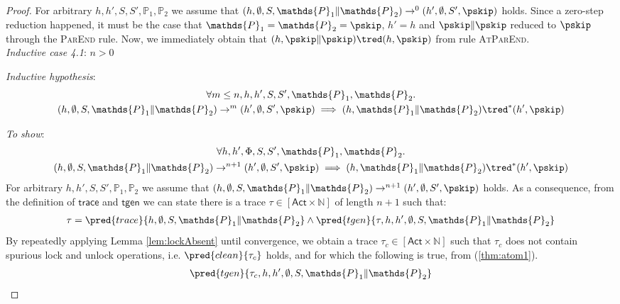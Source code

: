 \begin{thm}
{\begin{proof}
For arbitrary $h, h', S, S', \mathds{P}_1, \mathds{P}_2$ we assume that $(h, \emptyset, S, \mathds{P}_1 \| \mathds{P}_2) \rightarrow^0 (h', \emptyset, S', \pskip)$ holds. Since a zero-step reduction happened, it must be the case that $\mathds{P}_1 = \mathds{P}_2 = \pskip$, $h' = h$ and $\pskip \| \pskip$ reduced to $\pskip$ through the \textsc{ParEnd} rule. Now, we immediately obtain that $(h, \pskip \| \pskip) \tred (h, \pskip)$ from rule \textsc{AtParEnd}. \\

\textit{Inductive case 4.1}: $n > 0$

\textit{Inductive hypothesis}:
\begin{gather*}
	\forall m \leq n, h, h', S, S', \mathds{P}_1, \mathds{P}_2 \ldotp \\
	(h, \emptyset, S, \mathds{P}_1 \| \mathds{P}_2) \rightarrow^m (h', \emptyset, S', \pskip)
	\implies
	(h, \mathds{P}_1 \| \mathds{P}_2) \tred^* (h', \pskip)
\end{gather*}

\textit{To show}:
\begin{gather*}
	\forall h, h', \Phi, S, S', \mathds{P}_1, \mathds{P}_2 \ldotp \\
	(h, \emptyset, S, \mathds{P}_1 \| \mathds{P}_2) \rightarrow^{n+1} (h', \emptyset, S', \pskip)
	\implies
	(h, \mathds{P}_1 \| \mathds{P}_2) \tred^* (h', \pskip)
\end{gather*}
For arbitrary $h, h', S, S', \mathds{P}_1, \mathds{P}_2$ we assume that $(h, \emptyset, S, \mathds{P}_1 \| \mathds{P}_2) \rightarrow^{n+1} (h', \emptyset, S', \pskip)$ holds. As a consequence, from the definition of $\mathsf{trace}$ and $\mathsf{tgen}$ we can state there is a trace $\tau \in [\mathsf{Act} \times \mathds{N}]$ of length $n + 1$ such that:
\begin{gather}
	\label{thm:atom1}
	\tau = \pred{trace}{h, \emptyset, S, \mathds{P}_1 \| \mathds{P}_2} \land \pred{tgen}{\tau, h, h', \emptyset, S, \mathds{P}_1 \| \mathds{P}_2}
\end{gather}
By repeatedly applying Lemma \ref{lem:lockAbsent} until convergence, we obtain a trace $\tau_c \in [\mathsf{Act} \times \mathds{N}]$ such that $\tau_c$ does not contain spurious lock and unlock operations, i.e. $\pred{clean}{\tau_c}$ holds, and for which the following is true, from (\ref{thm:atom1}).
\begin{gather}
	\label{thm:atom2} \pred{tgen}{\tau_c, h, h', \emptyset, S, \mathds{P}_1 \| \mathds{P}_2}
\end{gather}


\end{proof}}
\end{thm}
